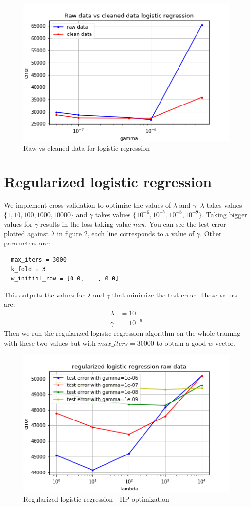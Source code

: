 \documentclass[11pt, a4paper, twocolumn]{article}
\begin{document}
\begin{figure}[h!]
  \includegraphics[width=\linewidth]{raw_vs_clean_log_reg.png}
  \caption{Raw vs cleaned data for logistic regression}
  \label{fig:raw_clean_log_reg}
\end{figure}

\newpage
\section{Regularized logistic regression}
We implement cross-validation to optimize the values of $\lambda$ and $\gamma$. $\lambda$ takes values
$\{1,10,100,1000,10000\}$ and $\gamma$ takes values $\{10^{-6},10^{-7},10^{-8},10^{-9}\}$. Taking bigger
values for $\gamma$ results in the loss taking value $nan$. You can see the test error plotted against $\lambda$ in figure \ref{fig:raw_reg_log_regr}, each line corresponds to a value of $\gamma$. Other parameters are: 
\begin{lstlisting}
  max_iters = 3000
  k_fold = 3
  w_initial_raw = [0.0, ..., 0.0]
\end{lstlisting}

This outputs the values for $\lambda$ and $\gamma$ that minimize the test error. These values are:
\begin{align*}
  \lambda &= 10 \\
  \gamma &= 10^{-6}
\end{align*}
Then we run the regularized logistic regression algorithm on the whole training with these two values but with $max\_iters = 30000$ to obtain a good $w$ vector.

\begin{figure}[h!]
  \includegraphics[width=\linewidth]{plots/raw_data_reg_log_regr.png}
  \caption{Regularized logistic regression - HP optimization}
  \label{fig:raw_reg_log_regr}
\end{figure}
\end{document}
